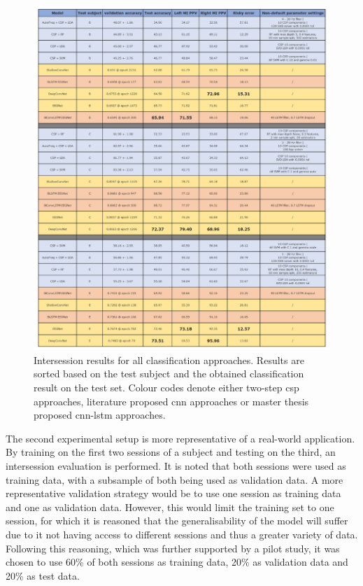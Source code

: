 \begin{figure}[!p]
    \centering
    \includegraphics[width=\linewidth]{../images/results/intersession.pdf}
    \captionsetup{width=\linewidth}
    \captionsetup{justification=centering}
    \caption{Intersession results for all classification approaches. Results are sorted based on the test subject and the obtained classification result on the test set. Colour codes denote either two-step \gls{csp} approaches, literature proposed \gls{cnn} approaches or master thesis proposed \gls{cnn}-\gls{lstm} approaches.} 
    \label{fig:results_intersession}
\end{figure}

The second experimental setup is more representative of a real-world application.
By training on the first two sessions of a subject and testing on the third, an intersession evaluation is performed.
It is noted that both sessions were used as training data, with a subsample of both being used as validation data.
A more representative validation strategy would be to use one session as training data and one as validation data.
However, this would limit the training set to one session, for which it is reasoned that the generalisability of the model will suffer due to it not having access to different sessions and thus a greater variety of data.
Following this reasoning, which was further supported by a pilot study, it was chosen to use 60\% of both sessions as training data,  20\% as validation data and 20\% as test data.

